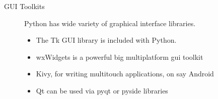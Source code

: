 \documentclass[]{book}
\begin{document}
\begin{description}
    \item [GUI Toolkits] Python has wide variety of graphical interface libraries.
        \begin{itemize}
            \item The Tk GUI library is included with Python.
            \item wxWidgets is a powerful big multiplatform gui toolkit
            \item Kivy, for writing multitouch applications, on say Android
            \item Qt can be used via pyqt or pyside libraries
        \end{itemize}
    \end{description}
\end{document}
